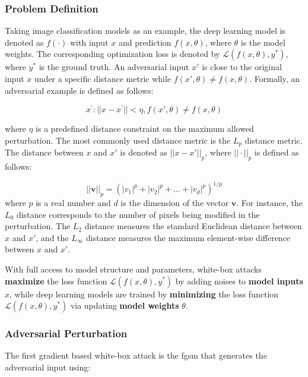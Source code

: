 \subsubsection{Problem Definition}

Taking image classification models as an example, the deep learning model is denoted as $f(\cdot)$ with input $x$ and prediction $f(x, \theta)$, where $\theta$ is the model weights. The corresponding optimization loss is denoted by $\mathcal{L}(f(x, \theta), y^*)$, where $y^*$ is the ground truth. An adversarial input $x'$ is close to the original input $x$ under a specific distance metric while $f(x', \theta) \neq f(x, \theta)$. Formally, an adversarial example is defined as follows:

\begin{equation}
x^{'}: ||x - x^{'}|| < \eta, f(x', \theta) \neq f(x, \theta)
\end{equation}

where $ \eta $ is a predefined distance constraint on the maximum allowed perturbation. The most commonly used distance metric is the $L_p$ distance metric. The distance between $x$ and $x'$ is denoted as $||x-x'||_{p}$, where $||\cdot||_p$ is defined as follows:

\begin{equation}
 ||\textbf{v}||_p = (|v_1|^p + |v_2|^p + \dots + |v_d|^p)^{1/p}
\end{equation}
where $p$ is a real number and $d$ is the dimension of the vector $\textbf{v}$. For instance, the $L_0$ distance corresponds to the number of pixels being modified in the perturbation. The $L_2$ distance measures the standard Euclidean distance between $x$ and $x'$, and the $L_\infty$ distance measures the maximum element-wise difference between $x$ and $x'$.

With full access to model structure and parameters, white-box attacks \textbf{maximize} the loss function  $\mathcal{L}(f(x, \theta), y^*)$ by adding noises to \textbf{ model inputs} $x$, while deep learning models are trained by \textbf{minimizing} the loss function  $\mathcal{L}(f(x, \theta), y^*)$ via updating \textbf{model weights} $\theta$.

\subsubsection{Adversarial Perturbation}

The first gradient based white-box attack is the \acrfull{fgsm} \citep{goodfellow2015explaining} that generates the adversarial input using:

